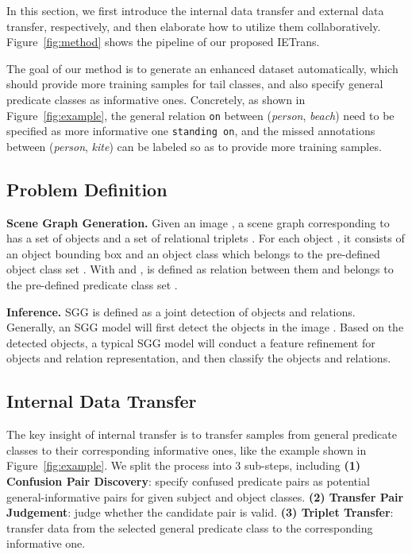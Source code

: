 \documentclass[runningheads]{llncs}
\begin{document}
In this section, we first introduce the internal data transfer and external data transfer, respectively, and then elaborate how to utilize them collaboratively. Figure~\ref{fig:method} shows the pipeline of our proposed IETrans.


The goal of our method is to generate an enhanced dataset automatically, which should provide more training samples for tail classes, and also specify general predicate classes as informative ones.
Concretely, as shown in Figure~\ref{fig:example}, the general relation \texttt{on} between (\textit{person}, \textit{beach}) need to be specified as more informative one \texttt{standing on}, and the missed annotations between (\textit{person}, \textit{kite}) can be labeled so as to provide more training samples.

\subsection{Problem Definition}


\smallskip
\noindent
\textbf{Scene Graph Generation.} Given an image , a scene graph corresponding to  has a set of objects  and a set of relational triplets . For each object , it consists of an object bounding box  and an object class  which belongs to the pre-defined object class set . With  and ,  is defined as relation between them and belongs to the pre-defined predicate class set .


\smallskip
\noindent
\textbf{Inference.} SGG is defined as a joint detection of objects and relations.
Generally, an SGG model will first detect the objects in the image .
Based on the detected objects, a typical SGG model will conduct a feature refinement for objects and relation representation, and then classify the objects and relations.

\subsection{Internal Data Transfer}
The key insight of internal transfer is to transfer samples from general predicate classes to their corresponding informative ones, like the example shown in Figure~\ref{fig:example}.
We split the process into 3 sub-steps, including \textbf{(1) Confusion Pair Discovery}: specify confused predicate pairs as potential general-informative pairs for given subject and object classes. 
\textbf{(2) Transfer Pair Judgement}: judge whether the candidate pair is valid. \textbf{(3) Triplet Transfer}: transfer data from the selected general predicate class to the corresponding informative one.
\end{document}
